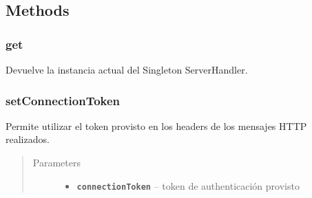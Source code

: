 \documentclass[letterpaper,10pt,english]{sphinxmanual}
\begin{document}
\subsection{Methods}
\label{Singletons/ServerHandler:methods}

\subsubsection{get}
\label{Singletons/ServerHandler:get}

\begin{fulllineitems}
\label{Singletons/ServerHandler:com.fiuba.tallerii.jobify.ServerHandler.get(Context)}
Devuelve la instancia actual del Singleton ServerHandler.

\end{fulllineitems}



\subsubsection{setConnectionToken}
\label{Singletons/ServerHandler:setconnectiontoken}

\begin{fulllineitems}
\label{Singletons/ServerHandler:com.fiuba.tallerii.jobify.ServerHandler.setConnectionToken(String)}
Permite utilizar el token provisto en los headers de los mensajes HTTP realizados.
\begin{quote}\begin{description}
\item[{Parameters}] \leavevmode\begin{itemize}
\item {} 
\textbf{\texttt{connectionToken}} -- token de authenticación provisto

\end{itemize}

\end{description}\end{quote}

\end{fulllineitems}
\end{document}
